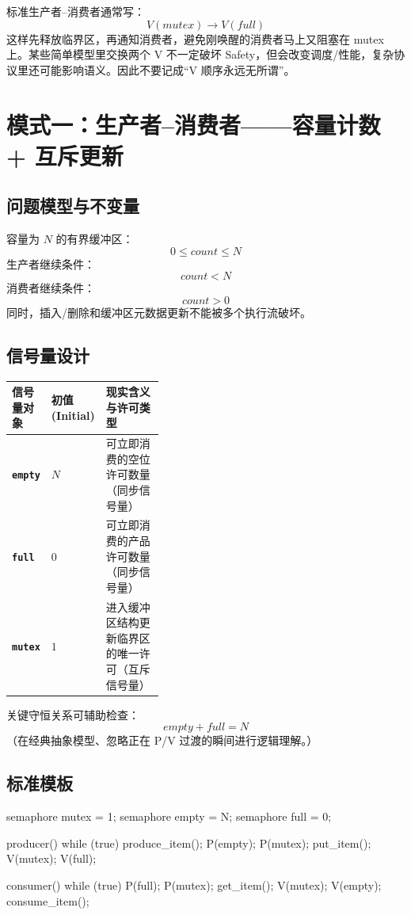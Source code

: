 \documentclass[11pt,a4paper]{ctexart}
\newcommand{\code}[1]{\texttt{#1}}
\begin{document}
标准生产者--消费者通常写：
\[
V(mutex)\to V(full)
\]
这样先释放临界区，再通知消费者，避免刚唤醒的消费者马上又阻塞在 mutex 上。某些简单模型里交换两个 V 不一定破坏 Safety，但会改变调度/性能，复杂协议里还可能影响语义。因此不要记成“V 顺序永远无所谓”。

\section{模式一：生产者--消费者——容量计数 + 互斥更新}

\subsection{问题模型与不变量}

容量为 $N$ 的有界缓冲区：
\[
0\le count\le N
\]
生产者继续条件：
\[
count<N
\]
消费者继续条件：
\[
count>0
\]
同时，插入/删除和缓冲区元数据更新不能被多个执行流破坏。

\subsection{信号量设计}

\begingroup
\small
\renewcommand{\arraystretch}{1.25}
\setlength{\tabcolsep}{6pt}
\begin{tabularx}{\linewidth}{>{\bfseries}p{0.2\linewidth} p{0.18\linewidth} X}
\toprule
信号量对象 & 初值 (Initial) & 现实含义与许可类型\\
\midrule
\code{empty} & $N$ & 可立即消费的空位许可数量（同步信号量）\\
\code{full} & $0$ & 可立即消费的产品许可数量（同步信号量）\\
\code{mutex} & $1$ & 进入缓冲区结构更新临界区的唯一许可（互斥信号量）\\
\bottomrule
\end{tabularx}
\endgroup

关键守恒关系可辅助检查：
\[
empty+full=N
\]
（在经典抽象模型、忽略正在 P/V 过渡的瞬间进行逻辑理解。）

\subsection{标准模板}

\begin{codeblock}
semaphore mutex = 1;
semaphore empty = N;
semaphore full  = 0;

producer() {
    while (true) {
        produce_item();
        P(empty);
        P(mutex);
        put_item();
        V(mutex);
        V(full);
    }
}

consumer() {
    while (true) {
        P(full);
        P(mutex);
        get_item();
        V(mutex);
        V(empty);
        consume_item();
    }
}
\end{codeblock}
\end{document}
